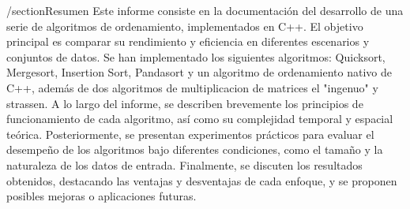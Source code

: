 
/section{Resumen}
Este informe consiste en la documentaci\'on del desarrollo de una serie de algoritmos de ordenamiento, implementados en C++. El objetivo principal es comparar su rendimiento y eficiencia en diferentes escenarios y conjuntos de datos. Se han implementado los siguientes algoritmos: Quicksort,
Mergesort, Insertion Sort, Pandasort y un algoritmo de ordenamiento nativo de C++, adem\'as de dos algoritmos de multiplicacion de matrices el "ingenuo" y strassen. 
A lo largo del informe, se describen brevemente los principios de funcionamiento de cada algoritmo, así como su complejidad temporal y espacial teórica. Posteriormente, se presentan experimentos prácticos para evaluar el desempeño de los algoritmos bajo diferentes condiciones, como el tamaño y la naturaleza de los datos de entrada.
Finalmente, se discuten los resultados obtenidos, destacando las ventajas y desventajas de cada enfoque, y se proponen posibles mejoras o aplicaciones futuras.